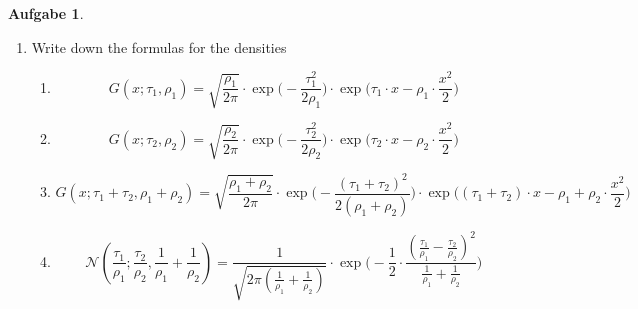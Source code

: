 \documentclass[12pt]{scrartcl}
\theoremstyle{definition}
\theoremstyle{exercise}
\newtheorem*{exercise*}{Aufgabe}
\begin{document}
\begin{exercise*}
\begin{enumerate}
			\item Write down the formulas for the densities
				\begin{enumerate}
					\item
						\begin{equation*}
							G(x; \tau_{1}, \rho_{1}) = \sqrt{\frac{\rho_{1}}{2 \pi}}\cdot \exp\Big
							(-\frac{\tau_{1}^{2}}{2\rho_{1}}\Big) \cdot \exp\Big(\tau_{1} \cdot
							x - \rho_{1} \cdot \frac{x^{2}}{2}\Big)
						\end{equation*}

					\item
						\begin{equation*}
							G(x; \tau_{2}, \rho_{2}) = \sqrt{\frac{\rho_{2}}{2 \pi}}\cdot \exp\Big
							(-\frac{\tau_{2}^{2}}{2\rho_{2}}\Big) \cdot \exp\Big(\tau_{2} \cdot
							x - \rho_{2} \cdot \frac{x^{2}}{2}\Big)
						\end{equation*}

					\item
						\begin{equation*}
							G(x; \tau_{1} + \tau_{2}, \rho_{1} + \rho_{2}) = \sqrt{\frac{\rho_{1}
							+ \rho_{2}}{2 \pi}}\cdot \exp\Big(-\frac{(\tau_{1} + \tau_{2})^{2}}{2(\rho_{1}
							+ \rho_{2})}\Big) \cdot \exp\Big((\tau_{1} + \tau_{2}) \cdot x - \rho
							_{1} + \rho_{2} \cdot \frac{x^{2}}{2}\Big)
						\end{equation*}

					\item
						\begin{equation*}
							\mathcal{N}(\frac{\tau_{1}}{\rho_{1}}; \frac{\tau_{2}}{\rho_{2}}, \frac{1}{\rho_{1}}
							+ \frac{1}{\rho_{2}}) = \frac{1}{\sqrt{2 \pi (\frac{1}{\rho_{1}} +
							\frac{1}{\rho_{2}})}}\cdot \exp\Big(- \frac{1}{2} \cdot \frac{(\frac{\tau_1}{\rho_1}-
							\frac{\tau_2}{\rho_2})^{2}}{\frac{1}{\rho_{1}} +
							\frac{1}{\rho_{2}}}\Big)
						\end{equation*}
				\end{enumerate}


\end{enumerate}
\end{exercise*}
\end{document}
